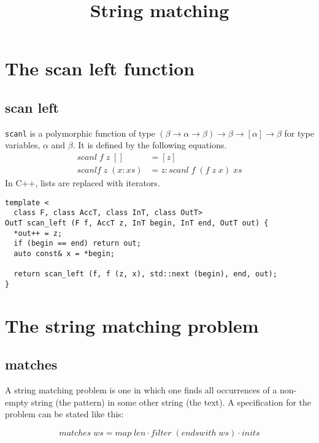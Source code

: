 \documentclass{article}
\title{String matching}
\begin{document}
\maketitle

\section{The scan left function}

\subsection{scan left}

\verb|scanl| is a polymorphic function of type \((\beta \to \alpha \to
\beta) \to \beta \to [\alpha] \to \beta\) for type variables,
\(\alpha\) and \(\beta\). It is defined by the following equations.
\begin{align*}
scanl\;f\;z\;[] &= [z] \\
scanlf\;z\;(x : xs) &= z : scanl\;f\;(f\;z\;x)\;xs
\end{align*}
In C++, lists are replaced with iterators.
\begin{verbatim}
template <
  class F, class AccT, class InT, class OutT>
OutT scan_left (F f, AccT z, InT begin, InT end, OutT out) {
  *out++ = z;
  if (begin == end) return out;
  auto const& x = *begin;

  return scan_left (f, f (z, x), std::next (begin), end, out);
}
\end{verbatim}

\section{The string matching problem}

\subsection{matches}
A string matching problem is one in which one finds all occurrences of
a non-empty string (the pattern) in some other string (the text). A
specification for the problem can be stated like this:

\begin{equation}\label{equation:specification}
matches\;ws =map\;len \cdot filter\;(endswith\;ws) \cdot inits
\end{equation}
\end{document}
